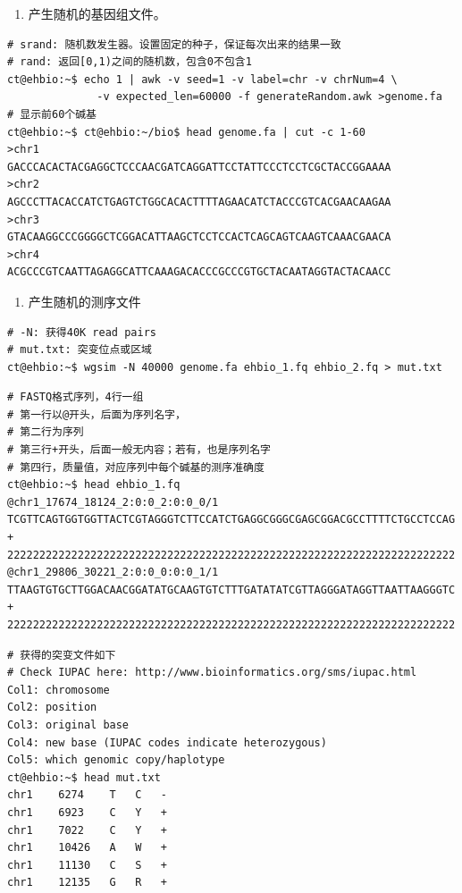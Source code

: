 \documentclass[]{article}
\providecommand{\tightlist}{%
  \setlength{\itemsep}{0pt}\setlength{\parskip}{0pt}}
\numberwithin{figure}{section}
\numberwithin{table}{section}
\begin{document}
\begin{enumerate}
\def\labelenumi{\arabic{enumi}.}
\setcounter{enumi}{1}
\tightlist
\item
  产生随机的基因组文件。
\end{enumerate}

\begin{verbatim}
# srand: 随机数发生器。设置固定的种子，保证每次出来的结果一致
# rand: 返回[0,1)之间的随机数，包含0不包含1
ct@ehbio:~$ echo 1 | awk -v seed=1 -v label=chr -v chrNum=4 \
			  -v expected_len=60000 -f generateRandom.awk >genome.fa
# 显示前60个碱基
ct@ehbio:~$ ct@ehbio:~/bio$ head genome.fa | cut -c 1-60
>chr1
GACCCACACTACGAGGCTCCCAACGATCAGGATTCCTATTCCCTCCTCGCTACCGGAAAA
>chr2
AGCCCTTACACCATCTGAGTCTGGCACACTTTTAGAACATCTACCCGTCACGAACAAGAA
>chr3
GTACAAGGCCCGGGGCTCGGACATTAAGCTCCTCCACTCAGCAGTCAAGTCAAACGAACA
>chr4
ACGCCCGTCAATTAGAGGCATTCAAAGACACCCGCCCGTGCTACAATAGGTACTACAACC
\end{verbatim}

\begin{enumerate}
\def\labelenumi{\arabic{enumi}.}
\setcounter{enumi}{2}
\tightlist
\item
  产生随机的测序文件
\end{enumerate}

\begin{verbatim}
# -N: 获得40K read pairs
# mut.txt: 突变位点或区域
ct@ehbio:~$ wgsim -N 40000 genome.fa ehbio_1.fq ehbio_2.fq > mut.txt
\end{verbatim}

\begin{verbatim}
# FASTQ格式序列，4行一组
# 第一行以@开头，后面为序列名字，
# 第二行为序列
# 第三行+开头，后面一般无内容；若有，也是序列名字
# 第四行，质量值，对应序列中每个碱基的测序准确度
ct@ehbio:~$ head ehbio_1.fq
@chr1_17674_18124_2:0:0_2:0:0_0/1
TCGTTCAGTGGTGGTTACTCGTAGGGTCTTCCATCTGAGGCGGGCGAGCGGACGCCTTTTCTGCCTCCAG
+
2222222222222222222222222222222222222222222222222222222222222222222222
@chr1_29806_30221_2:0:0_0:0:0_1/1
TTAAGTGTGCTTGGACAACGGATATGCAAGTGTCTTTGATATATCGTTAGGGATAGGTTAATTAAGGGTC
+
2222222222222222222222222222222222222222222222222222222222222222222222
\end{verbatim}

\begin{verbatim}
# 获得的突变文件如下
# Check IUPAC here: http://www.bioinformatics.org/sms/iupac.html
Col1: chromosome
Col2: position
Col3: original base
Col4: new base (IUPAC codes indicate heterozygous)
Col5: which genomic copy/haplotype 
ct@ehbio:~$ head mut.txt
chr1	6274	T	C	-
chr1	6923	C	Y	+
chr1	7022	C	Y	+
chr1	10426	A	W	+
chr1	11130	C	S	+
chr1	12135	G	R	+
\end{verbatim}
\end{document}
